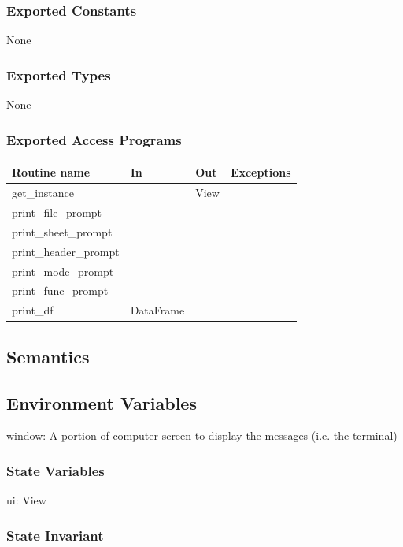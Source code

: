 \documentclass[12pt]{article}
\begin{document}
\subsubsection* {Exported Constants}

None

\subsubsection* {Exported Types}

None

\subsubsection* {Exported Access Programs}

\begin{tabular}{| l | l | l | p{5cm} |}
  \hline
  \textbf{Routine name} & \textbf{In} & \textbf{Out} & \textbf{Exceptions}\\
  \hline
  get\_instance &  & View & \\
  \hline
  print\_file\_prompt & &  & \\
  \hline
  print\_sheet\_prompt & & & \\
  \hline
  print\_header\_prompt & & & \\
  \hline
  print\_mode\_prompt & & & \\
  \hline
  print\_func\_prompt & & & \\
  \hline
  print\_df & DataFrame & & \\
  \hline

\end{tabular}

\subsection* {Semantics}

\subsection*{Environment Variables}

window: A portion of computer screen to display the messages (i.e. the terminal)

\subsubsection* {State Variables}

ui: View

\subsubsection* {State Invariant}
\end{document}
